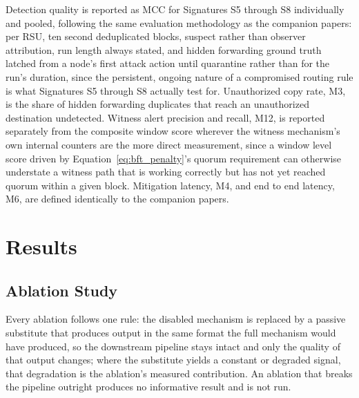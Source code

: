 \documentclass[final,5p,twocolumn]{elsarticle}
\theoremstyle{remark}
\theoremstyle{plain}
\begin{document}
Detection quality is reported as MCC for Signatures S5 through S8
individually and pooled, following the same evaluation methodology as the
companion papers: per RSU, ten second deduplicated blocks, suspect rather
than observer attribution, run length always stated, and hidden forwarding
ground truth latched from a node's first attack action until quarantine
rather than for the run's duration, since the persistent, ongoing nature of
a compromised routing rule is what Signatures S5 through S8 actually test
for. Unauthorized copy rate, M3, is the share of hidden forwarding
duplicates that reach an unauthorized destination undetected. Witness alert
precision and recall, M12, is reported separately from the composite window
score wherever the witness mechanism's own internal counters are the more
direct measurement, since a window level score driven by
Equation~\eqref{eq:bft_penalty}'s quorum requirement can otherwise
understate a witness path that is working correctly but has not yet reached
quorum within a given block. Mitigation latency, M4, and end to end
latency, M6, are defined identically to the companion papers.


\section{Results}
\label{sec:results}


\subsection{Ablation Study}
\label{sec:ablation}

Every ablation follows one rule: the disabled mechanism is replaced by a
passive substitute that produces output in the same format the full
mechanism would have produced, so the downstream pipeline stays intact and
only the quality of that output changes; where the substitute yields a
constant or degraded signal, that degradation is the ablation's measured
contribution. An ablation that breaks the pipeline outright produces no
informative result and is not run.
\end{document}
